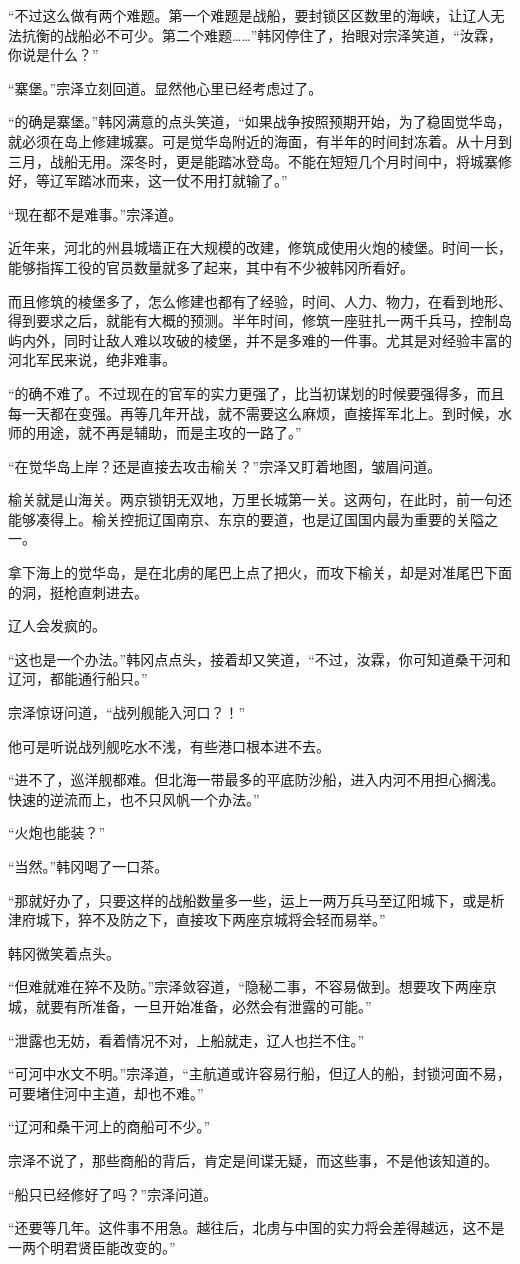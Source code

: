 “不过这么做有两个难题。第一个难题是战船，要封锁区区数里的海峡，让辽人无法抗衡的战船必不可少。第二个难题……”韩冈停住了，抬眼对宗泽笑道，“汝霖，你说是什么？”

“寨堡。”宗泽立刻回道。显然他心里已经考虑过了。

“的确是寨堡。”韩冈满意的点头笑道，“如果战争按照预期开始，为了稳固觉华岛，就必须在岛上修建城寨。可是觉华岛附近的海面，有半年的时间封冻着。从十月到三月，战船无用。深冬时，更是能踏冰登岛。不能在短短几个月时间中，将城寨修好，等辽军踏冰而来，这一仗不用打就输了。”

“现在都不是难事。”宗泽道。

近年来，河北的州县城墙正在大规模的改建，修筑成使用火炮的棱堡。时间一长，能够指挥工役的官员数量就多了起来，其中有不少被韩冈所看好。

而且修筑的棱堡多了，怎么修建也都有了经验，时间、人力、物力，在看到地形、得到要求之后，就能有大概的预测。半年时间，修筑一座驻扎一两千兵马，控制岛屿内外，同时让敌人难以攻破的棱堡，并不是多难的一件事。尤其是对经验丰富的河北军民来说，绝非难事。

“的确不难了。不过现在的官军的实力更强了，比当初谋划的时候要强得多，而且每一天都在变强。再等几年开战，就不需要这么麻烦，直接挥军北上。到时候，水师的用途，就不再是辅助，而是主攻的一路了。”

“在觉华岛上岸？还是直接去攻击榆关？”宗泽又盯着地图，皱眉问道。

榆关就是山海关。两京锁钥无双地，万里长城第一关。这两句，在此时，前一句还能够凑得上。榆关控扼辽国南京、东京的要道，也是辽国国内最为重要的关隘之一。

拿下海上的觉华岛，是在北虏的尾巴上点了把火，而攻下榆关，却是对准尾巴下面的洞，挺枪直刺进去。

辽人会发疯的。

“这也是一个办法。”韩冈点点头，接着却又笑道，“不过，汝霖，你可知道桑干河和辽河，都能通行船只。”

宗泽惊讶问道，“战列舰能入河口？！”

他可是听说战列舰吃水不浅，有些港口根本进不去。

“进不了，巡洋舰都难。但北海一带最多的平底防沙船，进入内河不用担心搁浅。快速的逆流而上，也不只风帆一个办法。”

“火炮也能装？”

“当然。”韩冈喝了一口茶。

“那就好办了，只要这样的战船数量多一些，运上一两万兵马至辽阳城下，或是析津府城下，猝不及防之下，直接攻下两座京城将会轻而易举。”

韩冈微笑着点头。

“但难就难在猝不及防。”宗泽敛容道，“隐秘二事，不容易做到。想要攻下两座京城，就要有所准备，一旦开始准备，必然会有泄露的可能。”

“泄露也无妨，看着情况不对，上船就走，辽人也拦不住。”

“可河中水文不明。”宗泽道，“主航道或许容易行船，但辽人的船，封锁河面不易，可要堵住河中主道，却也不难。”

“辽河和桑干河上的商船可不少。”

宗泽不说了，那些商船的背后，肯定是间谍无疑，而这些事，不是他该知道的。

“船只已经修好了吗？”宗泽问道。

“还要等几年。这件事不用急。越往后，北虏与中国的实力将会差得越远，这不是一两个明君贤臣能改变的。”

